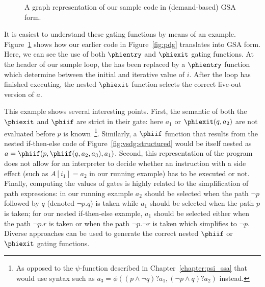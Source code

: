 \begin{figure}
\centering
{}
\subfloat[GSA]{
   \useheightbox{}
}
\caption{A graph representation of our sample code in (demand-based) GSA form.}
\label{fig:gsa-graph-example}
\end{figure}

It is easiest to understand these gating functions by means of an example. 
Figure~\ref{fig:gsa-graph-example} shows how our earlier code in Figure~\ref{fig:pdg} translates into GSA form. 
Here, we can see the use of both $\phientry$ and $\phiexit$ gating functions. 
At the header of our sample loop, the \phifun has been replaced by a $\phientry$ function which determine between the initial and iterative value of $i$. 
After the loop has finished executing, the nested $\phiexit$ function selects the correct live-out version of $a$.

This example shows several interesting points. 
First, the semantic of both the $\phiexit$ and $\phiif$ are strict in their gate: 
here $a_1$ or $\phiexit(q,a_2)$ are not evaluated before $p$ is known~\footnote{As opposed to the $\psi$-function described in Chapter~\ref{chapter:psi_ssa} that would use syntax such as $a_3=\phi((p\wedge \lnot q)?a_1, (\lnot p\wedge q)?a_2)$ instead.}. 
Similarly, a $\phiif$ function that results from the nested if-then-else code of Figure~\ref{fig:vsdg:structured} would be itself nested as $a=\phiif(p,\phiif(q,a_2,a_3),a_1)$. 
Second, this representation of the program does not allow for an interpreter to decide whether an instruction with a side effect (such as $A[i_1]=a_2$ in our running example) has to be executed or not. 
Finally, computing the values of gates is highly related to the simplification of path expressions: 
in our running example $a_2$ should be selected when the path $\lnot p$ followed by $q$ (denoted $\lnot p . 
q$) is taken while $a_1$ should be selected when the path $p$ is taken; 
for our nested if-then-else example, $a_1$ should be selected either when the path $\lnot p . 
r$ is taken or when the path $\lnot p . 
\lnot r$ is taken which simplifies to $\lnot p$. 
Diverse approaches can be used to generate the correct nested $\phiif$ or $\phiexit$ gating functions.

